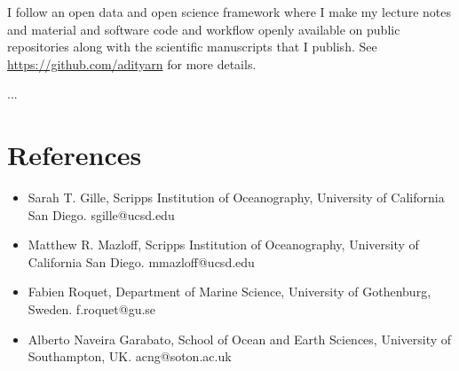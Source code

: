 \documentclass[12pt, a4paper]{article}
\begin{document}
I follow an open data and open science framework where I make my lecture notes and material and software code and workflow openly available on public repositories along with the scientific manuscripts that I publish. See \url{https://github.com/adityarn} for more details.

...
\vfill{}


\section*{References}

\begin{itemize}
\item Sarah T. Gille, Scripps Institution of Oceanography, University of California San Diego. sgille@ucsd.edu
\item Matthew R. Mazloff, Scripps Institution of Oceanography, University of California San Diego. mmazloff@ucsd.edu
\item Fabien Roquet, Department of Marine Science, University of Gothenburg, Sweden. f.roquet@gu.se
\item Alberto Naveira Garabato, School of Ocean and Earth Sciences, University of Southampton, UK. acng@soton.ac.uk
\end{itemize}
\end{document}
